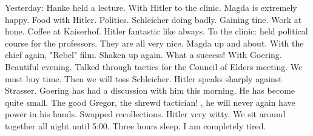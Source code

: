 Yesterday: Hanke held a lecture. With Hitler to the clinic. Magda is extremely happy. Food with Hitler. Politics. Schleicher doing badly. Gaining tine. Work at hone. Coffee at Kaiserhof. Hitler fantastic like always. To the clinic: held political course for the professors. They are all very nice. Magda up and about. With the chief again, "Rebel" film. Shaken up again. What a success! With Goering. Beautiful evening. Talked through tactics for the Council of Elders meeting. We must buy time. Then we will toss Schleicher. Hitler speaks sharply against Strasser. Goering has had a discussion with him this morning. He has become quite small. The good Gregor, the shrewd tactician!  , he will never again have power in his hands. Swapped recollections. Hitler very witty. We sit around together all night until 5:00. Three hours sleep. I am completely tired.
